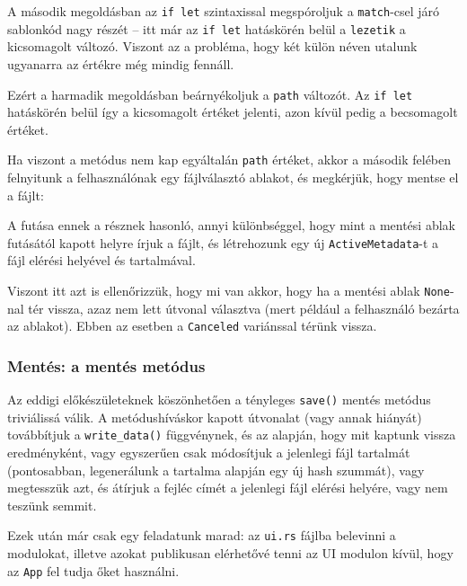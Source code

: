 A második megoldásban az \texttt{if let} szintaxissal megspóroljuk a \texttt{match}-csel
járó sablonkód nagy részét -- itt már az \texttt{if let} hatáskörén belül a \texttt{lezetik} a kicsomagolt változó.
Viszont az a probléma, hogy két külön néven utalunk ugyanarra az értékre még mindig fennáll.

Ezért a harmadik megoldásban beárnyékoljuk a \texttt{path} változót.
Az \texttt{if let} hatáskörén belül így a kicsomagolt értéket jelenti, 
azon kívül pedig a becsomagolt értéket.

Ha viszont a metódus nem kap egyáltalán \texttt{path} értéket, 
akkor a második felében felnyitunk a felhasználónak egy fájlválasztó ablakot,
és megkérjük, hogy mentse el a fájlt: 



A futása ennek a résznek hasonló, annyi különbséggel, hogy mint a mentési ablak futásától
kapott helyre írjuk a fájlt, és létrehozunk egy új \texttt{ActiveMetadata}-t
a fájl elérési helyével és tartalmával.

Viszont itt azt is ellenőrizzük, hogy mi van akkor, hogy ha a mentési ablak \texttt{None}-nal
tér vissza, azaz nem lett útvonal választva (mert például a felhasználó bezárta az ablakot).
Ebben az esetben a \texttt{Canceled} variánssal térünk vissza.

\subsubsection{Mentés: a mentés metódus}

Az eddigi előkészületeknek köszönhetően a tényleges \texttt{save()} mentés metódus triviálissá válik.
A metódushíváskor kapott útvonalat (vagy annak hiányát) továbbítjuk a \texttt{write\_data()} függvénynek,
és az alapján, hogy mit kaptunk vissza eredményként, vagy egyszerűen csak módosítjuk a jelenlegi
fájl tartalmát (pontosabban, legenerálunk a tartalma alapján egy új hash szummát),
vagy megtesszük azt, és átírjuk a fejléc címét a jelenlegi fájl elérési helyére,
vagy nem teszünk semmit.

Ezek után már csak egy feladatunk marad: az \texttt{ui.rs} fájlba belevinni a modulokat,
illetve azokat publikusan elérhetővé tenni az UI modulon kívül, hogy az \texttt{App}
fel tudja őket használni.